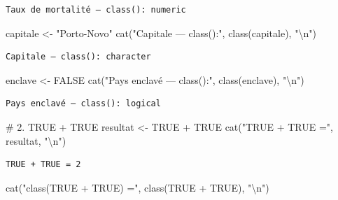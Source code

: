 \documentclass[
  french,
  11pt,
  a4paper,
]{article}
\newenvironment{Shaded}{}{}
\newcommand{\CommentTok}[1]{\textcolor[rgb]{0.42,0.45,0.49}{#1}}
\newcommand{\ConstantTok}[1]{\textcolor[rgb]{0.00,0.36,0.77}{#1}}
\newcommand{\FunctionTok}[1]{\textcolor[rgb]{0.44,0.26,0.76}{#1}}
\newcommand{\NormalTok}[1]{\textcolor[rgb]{0.14,0.16,0.18}{#1}}
\newcommand{\OtherTok}[1]{\textcolor[rgb]{0.44,0.26,0.76}{#1}}
\newcommand{\SpecialCharTok}[1]{\textcolor[rgb]{0.00,0.36,0.77}{#1}}
\newcommand{\StringTok}[1]{\textcolor[rgb]{0.01,0.18,0.38}{#1}}
\begin{document}
\begin{verbatim}
Taux de mortalité — class(): numeric 
\end{verbatim}

\begin{Shaded}
\begin{Highlighting}[]
\NormalTok{capitale }\OtherTok{\textless{}{-}} \StringTok{"Porto{-}Novo"}
\FunctionTok{cat}\NormalTok{(}\StringTok{"Capitale — class():"}\NormalTok{, }\FunctionTok{class}\NormalTok{(capitale), }\StringTok{"}\SpecialCharTok{\textbackslash{}n}\StringTok{"}\NormalTok{)}
\end{Highlighting}
\end{Shaded}

\begin{verbatim}
Capitale — class(): character 
\end{verbatim}

\begin{Shaded}
\begin{Highlighting}[]
\NormalTok{enclave }\OtherTok{\textless{}{-}} \ConstantTok{FALSE}
\FunctionTok{cat}\NormalTok{(}\StringTok{"Pays enclavé — class():"}\NormalTok{, }\FunctionTok{class}\NormalTok{(enclave), }\StringTok{"}\SpecialCharTok{\textbackslash{}n}\StringTok{"}\NormalTok{)}
\end{Highlighting}
\end{Shaded}

\begin{verbatim}
Pays enclavé — class(): logical 
\end{verbatim}

\begin{Shaded}
\begin{Highlighting}[]
\CommentTok{\# 2. TRUE + TRUE}
\NormalTok{resultat }\OtherTok{\textless{}{-}} \ConstantTok{TRUE} \SpecialCharTok{+} \ConstantTok{TRUE}
\FunctionTok{cat}\NormalTok{(}\StringTok{"TRUE + TRUE ="}\NormalTok{, resultat, }\StringTok{"}\SpecialCharTok{\textbackslash{}n}\StringTok{"}\NormalTok{)}
\end{Highlighting}
\end{Shaded}

\begin{verbatim}
TRUE + TRUE = 2 
\end{verbatim}

\begin{Shaded}
\begin{Highlighting}[]
\FunctionTok{cat}\NormalTok{(}\StringTok{"class(TRUE + TRUE) ="}\NormalTok{, }\FunctionTok{class}\NormalTok{(}\ConstantTok{TRUE} \SpecialCharTok{+} \ConstantTok{TRUE}\NormalTok{), }\StringTok{"}\SpecialCharTok{\textbackslash{}n}\StringTok{"}\NormalTok{)}
\end{Highlighting}
\end{Shaded}
\end{document}
